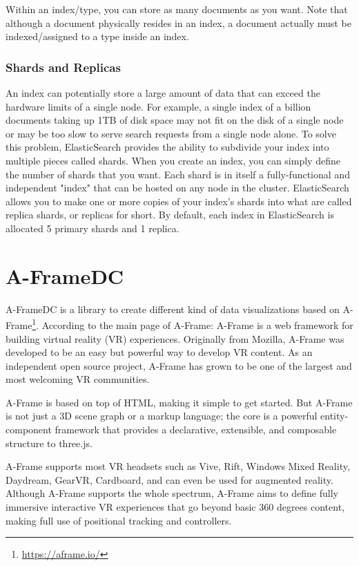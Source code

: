 \documentclass[a4paper, 12pt]{book}
\begin{document}
Within an index/type, you can store as many documents as you want. Note that although a document physically resides in an index, a document actually must be indexed/assigned to a type inside an index.

\subsubsection{Shards and Replicas}
An index can potentially store a large amount of data that can exceed the hardware limits of a single node. For example, a single index of a billion documents taking up 1TB of disk space may not fit on the disk of a single node or may be too slow to serve search requests from a single node alone. To solve this problem, ElasticSearch provides the ability to subdivide your index into multiple pieces called shards. When you create an index, you can simply define the number of shards that you want. Each shard is in itself a fully-functional and independent "index" that can be hosted on any node in the cluster.
ElasticSearch allows you to make one or more copies of your index's shards into what are called replica shards, or replicas for short. By default, each index in ElasticSearch is allocated 5 primary shards and 1 replica.

\section{A-FrameDC}
\label{sec:aframedc}

A-FrameDC is a library to create different kind of data visualizations based on A-Frame\footnote{\url{https://aframe.io/}}. According to the main page of A-Frame: A-Frame is a web framework for building virtual reality (VR) experiences. Originally from Mozilla, A-Frame was developed to be an easy but powerful way to develop VR content. As an independent open source project, A-Frame has grown to be one of the largest and most welcoming VR communities.

A-Frame is based on top of HTML, making it simple to get started. But A-Frame is not just a 3D scene graph or a markup language; the core is a powerful entity-component framework that provides a declarative, extensible, and composable structure to three.js.

A-Frame supports most VR headsets such as Vive, Rift, Windows Mixed Reality, Daydream, GearVR, Cardboard, and can even be used for augmented reality. Although A-Frame supports the whole spectrum, A-Frame aims to define fully immersive interactive VR experiences that go beyond basic 360 degrees content, making full use of positional tracking and controllers.
\end{document}
